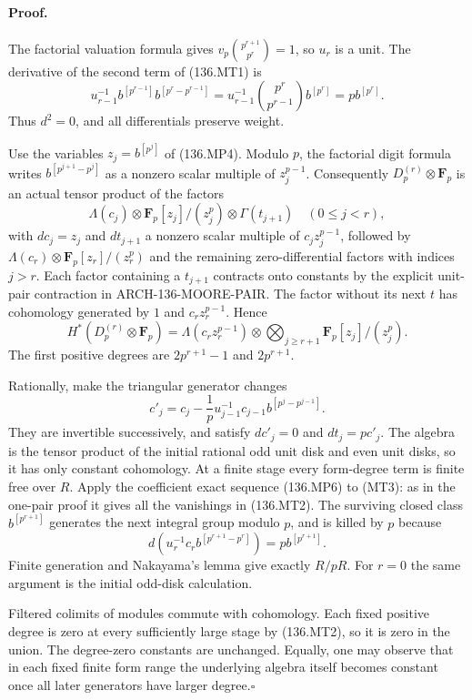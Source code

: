 \paragraph{Proof.}
The factorial valuation formula gives
$v_p\binom{p^{r+1}}{p^r}=1$, so $u_r$ is a unit.  The derivative
of the second term of (136.MT1) is
\[
 u_{r-1}^{-1}b^{[p^{r-1}]}b^{[p^r-p^{r-1}]}
      =u_{r-1}^{-1}\binom{p^r}{p^{r-1}}b^{[p^r]}
      =p b^{[p^r]}.
\]
Thus $d^2=0$, and all differentials preserve weight.

Use the variables $z_j=b^{[p^j]}$ of (136.MP4).  Modulo $p$, the
factorial digit formula writes
$b^{[p^{j+1}-p^j]}$ as a nonzero scalar multiple of $z_j^{p-1}$.
Consequently $D_p^{(r)}\otimes\mathbf F_p$ is an actual tensor
product of the factors
\[
 \Lambda(c_j)\otimes\mathbf F_p[z_j]/(z_j^p)
                    \otimes\Gamma(t_{j+1})\quad(0\leq j<r),
\]
with $dc_j=z_j$ and $dt_{j+1}$ a nonzero scalar multiple of
$c_jz_j^{p-1}$, followed by
$\Lambda(c_r)\otimes\mathbf F_p[z_r]/(z_r^p)$ and the remaining
zero-differential factors with indices $j>r$.
Each factor containing a $t_{j+1}$ contracts onto constants by
the explicit unit-pair contraction in ARCH-136-MOORE-PAIR.
The factor without its next $t$ has cohomology generated by
$1$ and $c_rz_r^{p-1}$.  Hence
\[
 H^*(D_p^{(r)}\otimes\mathbf F_p)
  =\Lambda(c_rz_r^{p-1})\otimes
                   \bigotimes_{j\geq r+1}
                              \mathbf F_p[z_j]/(z_j^p).   \tag{136.MT3}
\]
The first positive degrees are $2p^{r+1}-1$ and $2p^{r+1}$.

Rationally, make the triangular generator changes
\[
 c'_j=c_j-\frac1p u_{j-1}^{-1}c_{j-1}
                              b^{[p^j-p^{j-1}]}.
\]
They are invertible successively, and satisfy $dc'_j=0$ and
$dt_j=pc'_j$.  The algebra is the tensor product of the initial
rational odd unit disk and even unit disks, so it has only constant
cohomology.  At a finite stage every form-degree term is finite
free over $R$.  Apply the coefficient exact sequence (136.MP6) to
(MT3): as in the one-pair proof it gives all the vanishings in
(136.MT2).  The surviving closed class $b^{[p^{r+1}]}$ generates
the next integral group modulo $p$, and is killed by $p$ because
\[
 d\!\left(u_r^{-1}c_r b^{[p^{r+1}-p^r]}\right)
                          =p b^{[p^{r+1}]}.
\]
Finite generation and Nakayama's lemma give exactly $R/pR$.
For $r=0$ the same argument is the initial odd-disk calculation.

Filtered colimits of modules commute with cohomology.  Each fixed
positive degree is zero at every sufficiently large stage by
(136.MT2), so it is zero in the union.  The degree-zero constants
are unchanged.  Equally, one may observe that in each fixed finite
form range the underlying algebra itself becomes constant once
all later generators have larger degree.\hfill$\square$

